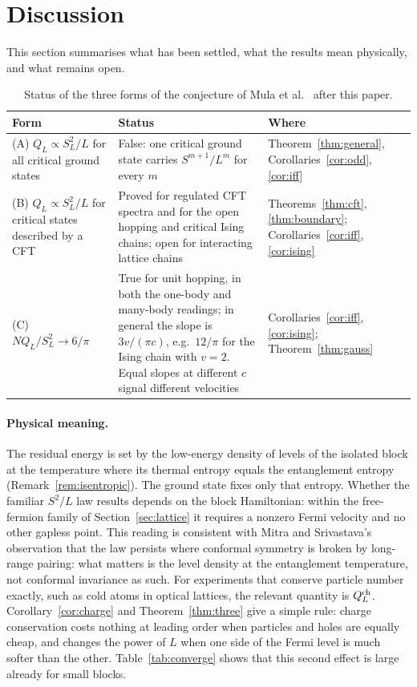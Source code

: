 \documentclass[11pt,a4paper]{article}
\theoremstyle{remark}
\begin{document}
\section{Discussion}\label{sec:discussion}
This section summarises what has been settled, what the results mean physically, and what remains open.

\begin{table}[htbp]\centering\small
\caption{Status of the three forms of the conjecture of Mula et al.\ \cite{mula} after this paper.}\label{tab:status}
\begin{tabular}{>{\raggedright}p{.3\linewidth}>{\raggedright}p{.3\linewidth}p{.3\linewidth}}
\toprule
Form & Status & Where\\
\midrule
(A) $Q_L\propto S_L^2/L$ for all critical ground states & False: one critical ground state carries $S^{m+1}/L^m$ for every $m$ & Theorem~\ref{thm:general}, Corollaries~\ref{cor:odd}, \ref{cor:iff}\\
(B) $Q_L\propto S_L^2/L$ for critical states described by a CFT & Proved for regulated CFT spectra and for the open hopping and critical Ising chains; open for interacting lattice chains & Theorems~\ref{thm:cft}, \ref{thm:boundary}; Corollaries~\ref{cor:iff}, \ref{cor:ising}\\
(C) $NQ_L/S_L^2\to6/\pi$ & True for unit hopping, in both the one-body and many-body readings; in general the slope is $3v/(\pi c)$, e.g.\ $12/\pi$ for the Ising chain with $v=2$. Equal slopes at different $c$ signal different velocities & Corollaries~\ref{cor:iff}, \ref{cor:ising}; Theorem~\ref{thm:gauss}\\
\bottomrule
\end{tabular}
\end{table}

\paragraph{Physical meaning.} The residual energy is set by the low-energy density of levels of the isolated block at the temperature where its thermal entropy equals the entanglement entropy (Remark~\ref{rem:isentropic}). The ground state fixes only that entropy. Whether the familiar $S^2/L$ law results depends on the block Hamiltonian: within the free-fermion family of Section~\ref{sec:lattice} it requires a nonzero Fermi velocity and no other gapless point. This reading is consistent with Mitra and Srivastava's observation \cite{mitra} that the law persists where conformal symmetry is broken by long-range pairing: what matters is the level density at the entanglement temperature, not conformal invariance as such. For experiments that conserve particle number exactly, such as cold atoms in optical lattices, the relevant quantity is $Q_L^{\rm ch}$. Corollary~\ref{cor:charge} and Theorem~\ref{thm:three} give a simple rule: charge conservation costs nothing at leading order when particles and holes are equally cheap, and changes the power of $L$ when one side of the Fermi level is much softer than the other. Table~\ref{tab:converge} shows that this second effect is large already for small blocks.
\end{document}
